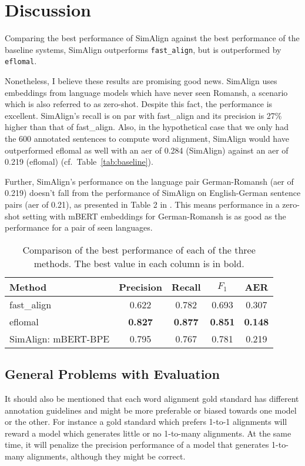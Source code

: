 \section{Discussion}
Comparing the best performance of SimAlign against the best performance of the baseline systems, SimAlign outperforms \texttt{fast\_align}, but is outperformed by \texttt{eflomal}.

Nonetheless, I believe these results are promising good news. 
SimAlign uses embeddings from language models which have never seen Romansh, a scenario which is also referred to as zero-shot. 
Despite this fact, the performance is excellent. 
SimAlign's recall is on par with fast\_align and its precision is 27\% higher than that of fast\_align. 
Also, in the hypothetical case that we only had the 600 annotated sentences to compute word alignment, SimAlign would have outperformed eflomal as well with an \acrshort{aer} of 0.284 (SimAlign) against an \acrshort{aer} of 0.219 (eflomal) (cf.~Table~\ref{tab:baseline}). 

Further,  SimAlign's performance on the language pair German-Romansh (\acrshort{aer} of 0.219) doesn't fall from the performance of SimAlign on English-German sentence pairs (\acrshort{aer} of 0.21),  as presented in Table 2 in \cite{jalili-sabet-etal-2020-simalign}. This means performance in a zero-shot setting  with mBERT embeddings  for German-Romansh is as good as the performance for a pair of seen languages.

\begin{table}
\centering
\begin{tabular}{lcccc}
	\toprule
							Method & Precision & Recall & $F_1$ & AER \\
\midrule
  fast\_align& 0.622	  & 0.782  & 0.693 & 0.307 \\

							eflomal     & \textbf{0.827} & \textbf{0.877} & \textbf{0.851} & \textbf{0.148} \\

SimAlign:                     mBERT-BPE & 0.795   & 0.767  & 0.781  & 0.219 \\
\bottomrule
\end{tabular}
\caption{Comparison of the best performance of each of the three methods. 
The best value in each column is in bold.}
\label{tab:comparison}
\end{table}


\subsection{General Problems with Evaluation}
\label{sec:problems-evaluation}
It should also be mentioned that each word alignment gold standard has different annotation guidelines and might be more preferable or biased towards one model or the other. 
For instance a gold standard which prefers 1-to-1 alignments will reward a model which generates little or no 1-to-many alignments. 
At the same time, it will penalize the precision performance of a model that generates 1-to-many alignments, although they might be correct.


